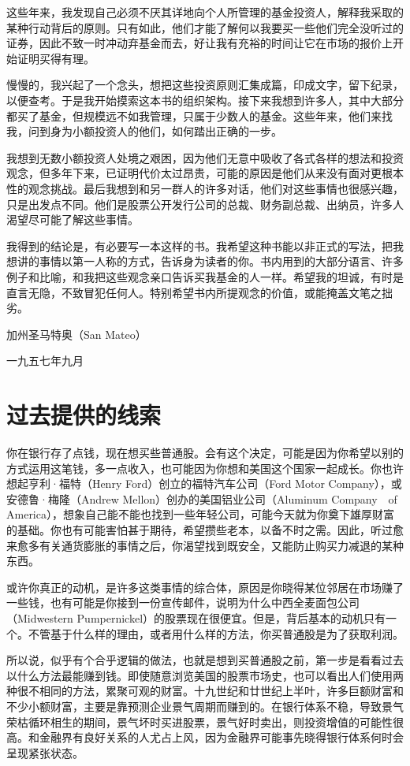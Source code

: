 \documentclass[UTF8,a4paper,zihao=-4,fontset = windows]{ctexart} %
\begin{document}
这些年来，我发现自己必须不厌其详地向个人所管理的基金投资人，解释我采取的某种行动背后的原则。只有如此，他们才能了解何以我要买一些他们完全没听过的证券，因此不致一时冲动弃基金而去，好让我有充裕的时间让它在市场的报价上开始证明买得有理。

慢慢的，我兴起了一个念头，想把这些投资原则汇集成篇，印成文字，留下纪录，以便查考。于是我开始摸索这本书的组织架构。接下来我想到许多人，其中大部分都买了基金，但规模远不如我管理，只属于少数人的基金。这些年来，他们来找我，问到身为小额投资人的他们，如何踏出正确的一步。

我想到无数小额投资人处境之艰困，因为他们无意中吸收了各式各样的想法和投资观念，但多年下来，已证明代价太过昂贵，可能的原因是他们从来没有面对更根本性的观念挑战。最后我想到和另一群人的许多对话，他们对这些事情也很感兴趣，只是出发点不同。他们是股票公开发行公司的总裁、财务副总裁、出纳员，许多人渴望尽可能了解这些事情。

我得到的结论是，有必要写一本这样的书。我希望这种书能以非正式的写法，把我想讲的事情以第一人称的方式，告诉身为读者的你。书内用到的大部分语言、许多例子和比喻，和我把这些观念亲口告诉买我基金的人一样。希望我的坦诚，有时是直言无隐，不致冒犯任何人。特别希望书内所提观念的价值，或能掩盖文笔之拙劣。


加州圣马特奥（San Mateo）

一九五七年九月

\section{过去提供的线索}

你在银行存了点钱，现在想买些普通股。会有这个决定，可能是因为你希望以别的方式运用这笔钱，多一点收入，也可能因为你想和美国这个国家一起成长。你也许想起亨利·福特（Henry Ford）创立的福特汽车公司（Ford Motor Company），或安德鲁·梅隆（Andrew Mellon）创办的美国铝业公司（Aluminum Company　of America），想象自己能不能也找到一些年轻公司，可能今天就为你奠下雄厚财富的基础。你也有可能害怕甚于期待，希望攒些老本，以备不时之需。因此，听过愈来愈多有关通货膨胀的事情之后，你渴望找到既安全，又能防止购买力减退的某种东西。

或许你真正的动机，是许多这类事情的综合体，原因是你晓得某位邻居在市场赚了一些钱，也有可能是你接到一份宣传邮件，说明为什么中西全麦面包公司（Midwestern Pumpernickel）的股票现在很便宜。但是，背后基本的动机只有一个。不管基于什么样的理由，或者用什么样的方法，你买普通股是为了获取利润。

所以说，似乎有个合乎逻辑的做法，也就是想到买普通股之前，第一步是看看过去以什么方法最能赚到钱。即使随意浏览美国的股票市场史，也可以看出人们使用两种很不相同的方法，累聚可观的财富。十九世纪和廿世纪上半叶，许多巨额财富和不少小额财富，主要是靠预测企业景气周期而赚到的。在银行体系不稳，导致景气荣枯循环相生的期间，景气坏时买进股票，景气好时卖出，则投资增值的可能性很高。和金融界有良好关系的人尤占上风，因为金融界可能事先晓得银行体系何时会呈现紧张状态。
\end{document}
